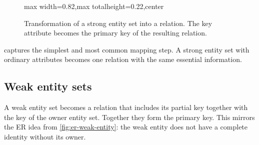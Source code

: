 \documentclass[11pt,a4paper,openany]{book}
\newcommand{\keyattr}[1]{\underline{#1}}
\begin{document}
\begin{figure}[tbp]
\centering
\begin{adjustbox}{max width=0.82\linewidth,max totalheight=0.22\textheight,center}
\end{adjustbox}
\caption{Transformation of a strong entity set into a relation. The key attribute becomes the primary key of the resulting relation.}
\label{fig:rel-strong-entity-rule}
\end{figure}

 captures the simplest and most common mapping step. A strong entity set with ordinary attributes becomes one relation with the same essential information.

\subsection{Weak entity sets}
A weak entity set becomes a relation that includes its partial key together with the key of the owner entity set. Together they form the primary key. This mirrors the ER idea from \cref{fig:er-weak-entity}: the weak entity does not have a complete identity without its owner.
\end{document}
